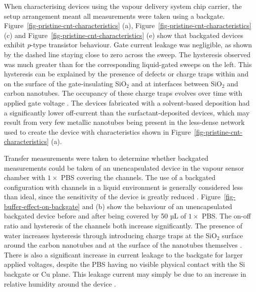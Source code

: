 \documentclass[
  a4paper,
]{scrbook}
\begin{document}
When characterising devices using the vapour delivery system chip
carrier, the setup arrangement meant all measurements were taken using a
backgate. Figure~\ref{fig-pristine-cnt-characteristics} (a),
Figure~\ref{fig-pristine-cnt-characteristics} (c) and
Figure~\ref{fig-pristine-cnt-characteristics} (e) show that backgated
devices exhibit \emph{p}-type transistor behaviour. Gate current leakage
was negligible, as shown by the dashed line staying close to zero across
the sweep. The hysteresis observed was much greater than for the
corresponding liquid-gated sweeps on the left. This hysteresis can be
explained by the presence of defects or charge traps within and on the
surface of the gate-insulating SiO\(_2\) and at interfaces between
SiO\(_2\) and carbon nanotubes. The occupancy of these charge traps
evolves over time with applied gate voltage
\autocite{Lee2007,Lee2012,Ha2014}. The devices fabricated with a
solvent-based deposition had a significantly lower off-current than the
surfactant-deposited devices, which may result from very few metallic
nanotubes being present in the less-dense network \autocite{Rouhi2011}
used to create the device with characteristics shown in
Figure~\ref{fig-pristine-cnt-characteristics} (a).

Transfer measurements were taken to determine whether backgated
measurements could be taken of an unencapsulated device in the vapour
sensor chamber with \(1 \times\) PBS covering the channels. The use of a
backgated configuration with channels in a liquid environment is
generally considered less than ideal, since the sensitivity of the
device is greatly reduced \autocite{Li2023}.
Figure~\ref{fig-buffer-effect-on-backgate} and (b) show the behaviour of
an unencapsulated backgated device before and after being covered by 50
µL of \(1 \times\) PBS. The on-off ratio and hysteresis of the channels
both increase significantly. The presence of water increases hysteresis
through introducing charge traps at the SiO\(_2\) surface around the
carbon nanotubes and at the surface of the nanotubes themselves
\autocite{Kim2003,Lee2007,Franklin2012,Ha2014}. There is also a
significant increase in current leakage to the backgate for larger
applied voltages, despite the PBS having no visible physical contact
with the Si backgate or Cu plane. This leakage current may simply be due
to an increase in relative humidity around the device
\autocite{Conseil2014}.
\end{document}
